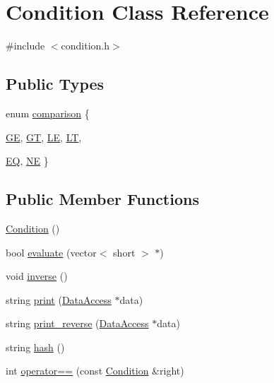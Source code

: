\hypertarget{classCondition}{
\section{Condition Class Reference}
\label{classCondition}
}


{\ttfamily \#include $<$condition.h$>$}

\subsection*{Public Types}
\begin{DoxyCompactItemize}
\item 
enum \hyperlink{classCondition_af41afbd9545b1fb2e2cb4a4792d52408}{comparison} \{ \par
\hyperlink{classCondition_af41afbd9545b1fb2e2cb4a4792d52408a7bdd26a389de897c518f2e7c47c9b9fa}{GE}, 
\hyperlink{classCondition_af41afbd9545b1fb2e2cb4a4792d52408ab0e581f3ae4b7a4ae2f77a3448c3ae73}{GT}, 
\hyperlink{classCondition_af41afbd9545b1fb2e2cb4a4792d52408ab3b023e6fa08cc0029192012b5a9846c}{LE}, 
\hyperlink{classCondition_af41afbd9545b1fb2e2cb4a4792d52408a852b6dd7b2dd782a2bde9d8d80a822d6}{LT}, 
\par
\hyperlink{classCondition_af41afbd9545b1fb2e2cb4a4792d52408a19ca99ac1f587159a6a170f37c22626d}{EQ}, 
\hyperlink{classCondition_af41afbd9545b1fb2e2cb4a4792d52408ab5f11e0e13fa4dea2863922a39e921f3}{NE}
 \}
\end{DoxyCompactItemize}
\subsection*{Public Member Functions}
\begin{DoxyCompactItemize}
\item 
\hyperlink{classCondition_af11513db4fcbde93961fa0b65e7ab764}{Condition} ()
\item 
bool \hyperlink{classCondition_a332c47202b299556963b3a68b050d3b9}{evaluate} (vector$<$ short $>$ $\ast$)
\item 
void \hyperlink{classCondition_a6f95eacf1437f7800ebf81c89a6cf6c0}{inverse} ()
\item 
string \hyperlink{classCondition_a00c6f9ba842c26e21bba25848f2b0404}{print} (\hyperlink{classDataAccess}{DataAccess} $\ast$data)
\item 
string \hyperlink{classCondition_a8307a156ebd3e09433f30bf9975f60d6}{print\_\-reverse} (\hyperlink{classDataAccess}{DataAccess} $\ast$data)
\item 
string \hyperlink{classCondition_a2139d8d1ae38b2ca9dfea947b3f6f858}{hash} ()
\item 
int \hyperlink{classCondition_ad4c38e1ab62b02a54cec27b36d957c21}{operator==} (const \hyperlink{classCondition}{Condition} \&right)
\end{DoxyCompactItemize}
